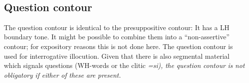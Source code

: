  \\






% 







\subsection{Question contour}\label{sec:phon:Questioncontour}
The question contour is identical to the presuppositive contour: It has a LH boundary tone. It might be possible to combine them into a ``non-assertive'' contour; for expository reasons this is not done here. The question contour is used for interrogative illocution. Given that there is also segmental material which signals questions (WH-words or the clitic \em =si\em), the question contour is not obligatory if either of these are present.

